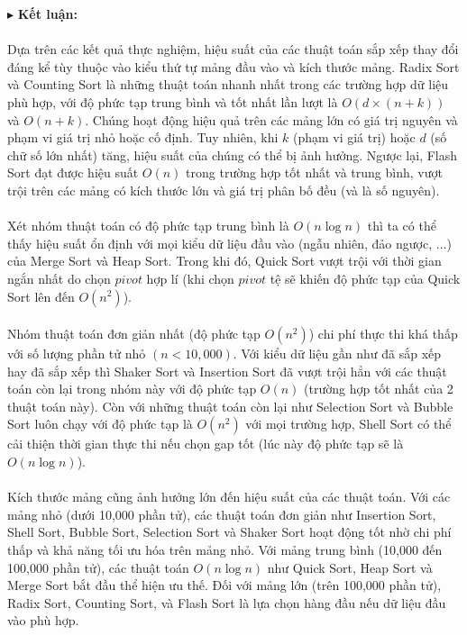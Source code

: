 \pagebreak

$\blacktriangleright$ \textbf{Kết luận:}
\\\\
Dựa trên các kết quả thực nghiệm, hiệu suất của các thuật toán sắp xếp 
thay đổi đáng kể tùy thuộc vào kiểu thứ tự mảng đầu vào và kích thước 
mảng. Radix Sort và Counting Sort là những thuật toán nhanh nhất trong 
các trường hợp dữ liệu phù hợp, với độ phức tạp trung bình và tốt nhất 
lần lượt là $O\left(d\times\left(n+k\right)\right)$ và $O\left(n+k\right)$. 
Chúng hoạt động hiệu quả trên 
các mảng lớn có giá trị nguyên và phạm vi giá trị nhỏ hoặc cố định. Tuy 
nhiên, khi $k$ (phạm vi giá trị) hoặc $d$ (số chữ số lớn nhất) tăng, 
hiệu suất của chúng có thể bị ảnh hưởng. Ngược lại, Flash Sort đạt được 
hiệu suất $O\left(n\right)$ trong trường hợp tốt nhất và trung bình, vượt trội trên 
các mảng có kích thước lớn và giá trị phân bố đều (và là số nguyên).  
\\\\
Xét nhóm thuật toán có độ phức tạp trung bình là $O\left(n\log{n}\right)$ thì ta có 
thể thấy hiệu suất ổn định với mọi kiểu dữ liệu đầu vào (ngẫu nhiên, đảo 
ngược, ...) của Merge Sort và Heap Sort. Trong khi đó, Quick Sort vượt 
trội với thời gian ngắn nhất do chọn $pivot$ hợp lí (khi chọn $pivot$ tệ 
sẽ khiến độ phức tạp của Quick Sort lên đến $O\left(n^2\right)$). 
\\\\
Nhóm thuật toán đơn giản nhất (độ phức tạp $O\left(n^2\right)$) chi phí thực thi 
khá thấp với số lượng phần tử nhỏ $(n < 10,000)$. Với kiểu dữ liệu gần 
như đã sắp xếp hay đã sắp xếp thì Shaker Sort và Insertion Sort đã vượt 
trội hẳn với các thuật toán còn lại trong nhóm này với độ phức tạp $O\left(n\right)$ 
(trường hợp tốt nhất của 2 thuật toán này). Còn với những thuật toán còn 
lại như Selection Sort và Bubble Sort luôn chạy với độ phức tạp là $O\left(n^2\right)$ 
với mọi trường hợp, Shell Sort có thể cải thiện thời gian thực thi nếu 
chọn gap tốt (lúc này độ phức tạp sẽ là $O\left(n\log{n}\right)$).
\\\\
Kích thước mảng cũng ảnh hưởng lớn đến hiệu suất của các thuật toán. Với 
các mảng nhỏ (dưới 10,000 phần tử), các thuật toán đơn giản như Insertion 
Sort, Shell Sort, Bubble Sort,  Selection Sort và Shaker Sort hoạt động 
tốt nhờ chi phí thấp và khả năng tối ưu hóa trên mảng nhỏ. Với mảng trung 
bình (10,000 đến 100,000 phần tử), các thuật toán $O\left(n\log{n}\right)$ như Quick 
Sort, Heap Sort và Merge Sort bắt đầu thể hiện ưu thế. Đối với mảng lớn 
(trên 100,000 phần tử), Radix Sort, Counting Sort, và Flash Sort là lựa 
chọn hàng đầu nếu dữ liệu đầu vào phù hợp. 

